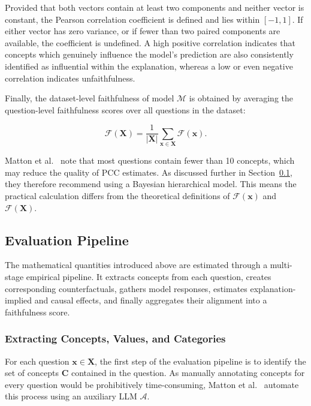 Provided that both vectors contain at least two components and neither vector is constant, the Pearson correlation coefficient is defined and lies within $[-1,1]$. If either vector has zero variance, or if fewer than two paired components are available, the coefficient is undefined. A high positive correlation indicates that concepts which genuinely influence the model's prediction are also consistently identified as influential within the explanation, whereas a low or even negative correlation indicates unfaithfulness.

Finally, the dataset-level faithfulness of model $\mathcal{M}$ is obtained by averaging the question-level faithfulness scores over all questions in the dataset:

\begin{equation}
	\label{eq:dataset_faithfulness}
	\mathcal{F}(\mathbf{X})=
	\frac{1}{|\mathbf{X}|}
	\sum_{\mathbf{x} \in \mathbf{X}}
	\mathcal{F}(\mathbf{x}).
\end{equation}

Matton et al.~\cite{mattonWalkTalkMeasuring2024} note that most questions contain fewer than 10 concepts, which may reduce the quality of PCC estimates. As discussed further in Section~\ref{sec:matton_evaluation_pipeline}, they therefore recommend using a Bayesian hierarchical model. This means the practical calculation differs from the theoretical definitions of $\mathcal{F}(\mathbf{x})$ and $\mathcal{F}(\mathbf{X})$.

\subsection{Evaluation Pipeline}
\label{sec:matton_evaluation_pipeline}
The mathematical quantities introduced above are estimated through a multi-stage empirical pipeline. It extracts concepts from each question, creates corresponding counterfactuals, gathers model responses, estimates explanation-implied and causal effects, and finally aggregates their alignment into a faithfulness score.

\subsubsection{Extracting Concepts, Values, and Categories}

For each question $\mathbf{x} \in \mathbf{X}$, the first step of the evaluation pipeline is to identify the set of concepts $\mathbf{C}$ contained in the question. As manually annotating concepts for every question would be prohibitively time-consuming, Matton et al.~\cite{mattonWalkTalkMeasuring2024} automate this process using an auxiliary LLM $\mathcal{A}$.

